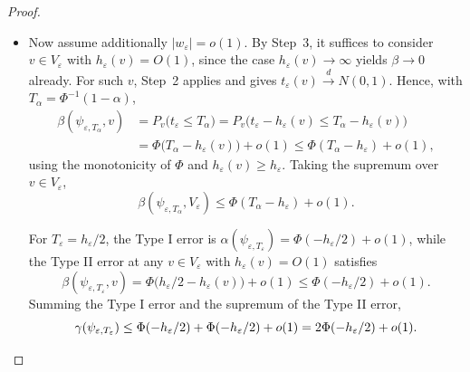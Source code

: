 \begin{proof}
\begin{itemize}
For Type II error in the consistency regime, fix $v \in V_\varepsilon$, so
$h_\varepsilon(v) \geq h_\varepsilon \to \infty$, and set $T_\varepsilon = h_\varepsilon/2$.
By Chebyshev,
\[
  \beta(\psi_{w_\varepsilon, T_\varepsilon}, v)
   = P_v(t_\varepsilon \leq T_\varepsilon)
   \leq P_v\bigl(|t_\varepsilon - h_\varepsilon(v)| \geq h_\varepsilon(v) - h_\varepsilon/2\bigr)
   \leq \frac{\operatorname{Var}_v(t_\varepsilon)}{(h_\varepsilon(v) - h_\varepsilon/2)^2}.
\]
Since $h_\varepsilon(v) \geq h_\varepsilon$ implies $h_\varepsilon(v) - h_\varepsilon/2 \geq
h_\varepsilon/2$, and $\operatorname{Var}_v(t_\varepsilon) \leq 1 + 4|w_\varepsilon|
h_\varepsilon(v)$,
\[
  \beta(\psi_{w_\varepsilon, T_\varepsilon}, v)
   \leq \frac{1 + 4|w_\varepsilon| h_\varepsilon(v)}{(h_\varepsilon/2)^2}
   = O\!\left(\frac{1}{h_\varepsilon^2} + \frac{|w_\varepsilon| h_\varepsilon(v)}{h_\varepsilon^2}\right) = o(1).
\]
Taking the supremum over $v \in V_\varepsilon$,
\[
  \gamma(\psi_{w_\varepsilon, T_\varepsilon}, V_\varepsilon)
   = \alpha(\psi_{w_\varepsilon, T_\varepsilon}) + \sup_{v \in V_\varepsilon}
       \beta(\psi_{w_\varepsilon, T_\varepsilon}, v) \to 0.
\]

\item Now assume additionally $|w_\varepsilon| = o(1)$. By Step~3, it suffices to consider
$v \in V_\varepsilon$ with $h_\varepsilon(v) = O(1)$, since the case $h_\varepsilon(v) \to \infty$
yields $\beta \to 0$ already. For such $v$, Step~2 applies and gives
$t_\varepsilon(v) \xrightarrow{d} N(0, 1)$. Hence, with $T_\alpha = \Phi^{-1}(1 - \alpha)$,
\begin{align*}
  \beta(\psi_{\varepsilon, T_\alpha}, v)
   &= P_v\bigl(t_\varepsilon \leq T_\alpha\bigr)
    = P_v\bigl(t_\varepsilon - h_\varepsilon(v) \leq T_\alpha - h_\varepsilon(v)\bigr) \\
   &= \Phi\bigl(T_\alpha - h_\varepsilon(v)\bigr) + o(1)
    \leq \Phi(T_\alpha - h_\varepsilon) + o(1),
\end{align*}
using the monotonicity of $\Phi$ and $h_\varepsilon(v) \geq h_\varepsilon$. Taking the
supremum over $v \in V_\varepsilon$,
\[
  \beta(\psi_{\varepsilon, T_\alpha}, V_\varepsilon) \leq \Phi(T_\alpha - h_\varepsilon) + o(1).
\]

For $T_\varepsilon = h_\varepsilon/2$, the Type I error is
$\alpha(\psi_{\varepsilon, T_\varepsilon}) = \Phi(-h_\varepsilon/2) + o(1)$, while the
Type II error at any $v \in V_\varepsilon$ with $h_\varepsilon(v) = O(1)$ satisfies
\[
  \beta(\psi_{\varepsilon, T_\varepsilon}, v)
   = \Phi\bigl(h_\varepsilon/2 - h_\varepsilon(v)\bigr) + o(1)
   \leq \Phi(-h_\varepsilon/2) + o(1).
\]
Summing the Type I error and the supremum of the Type II error,
\[
  \gamma(\psi_{\varepsilon, T_\varepsilon})
   \leq \Phi(-h_\varepsilon/2) + \Phi(-h_\varepsilon/2) + o(1)
   = 2\Phi(-h_\varepsilon/2) + o(1). \qedhere
\]
\end{itemize}
\end{proof}
